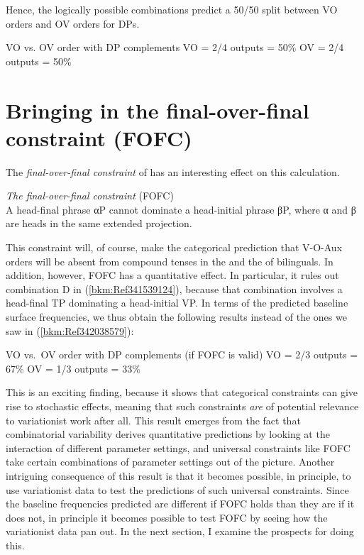 \documentclass[output=paper]{langsci/langscibook}
\begin{document}
Hence, the logically possible combinations predict a 50/50 split between VO
orders and OV orders for DPs.\pagebreak

\ea\label{bkm:Ref342038579}VO vs. OV order with DP complements
    \sn VO = 2/4 outputs = 50\%
    \sn OV = 2/4 outputs = 50\%
\z

\section{Bringing in the final-over-final constraint (FOFC)}\label{sec-30:key:2}

The \emph{final-over-final constraint} of \textcite[171]{BibHolRob2014} has an
interesting effect on this calculation.

\ea \emph{The final-over-final constraint} (FOFC)\\
    A head-final phrase αP cannot dominate a head-initial phrase βP, where α
    and β are heads in the same extended projection.
\z

This constraint will, of course, make the categorical prediction that V-O-Aux
orders will be absent from compound tenses in the  and the  of
bilinguals.  In addition, however, \gls{FOFC} has a quantitative effect.  In
particular, it rules out combination D in (\ref{bkm:Ref341539124}), because
that combination involves a head-final TP dominating a head-initial VP.  In
terms of the predicted baseline surface frequencies, we thus obtain the
following results instead of the ones we saw in (\ref{bkm:Ref342038579}):

\ea VO vs.\ OV order with DP complements (if \gls{FOFC} is valid)
    \sn VO = 2/3 outputs = 67\%
    \sn OV = 1/3 outputs = 33\%
\z

This is an exciting finding, because it shows that categorical constraints can
give rise to stochastic effects, meaning that such constraints \emph{are} of
potential relevance to variationist work after all.  This result emerges from
the fact that combinatorial variability derives quantitative predictions by
looking at the interaction of different parameter settings, and universal
constraints like \gls{FOFC} take certain combinations of parameter settings out of
the picture.  Another intriguing consequence of this result is that it becomes
possible, in principle, to use variationist data to test the predictions of
such universal constraints.  Since the baseline frequencies predicted are
different if \gls{FOFC} holds than they are if it does not, in principle it becomes
possible to test \gls{FOFC} by seeing how the variationist data pan out.  In the next
section, I examine the prospects for doing this.
\end{document}
